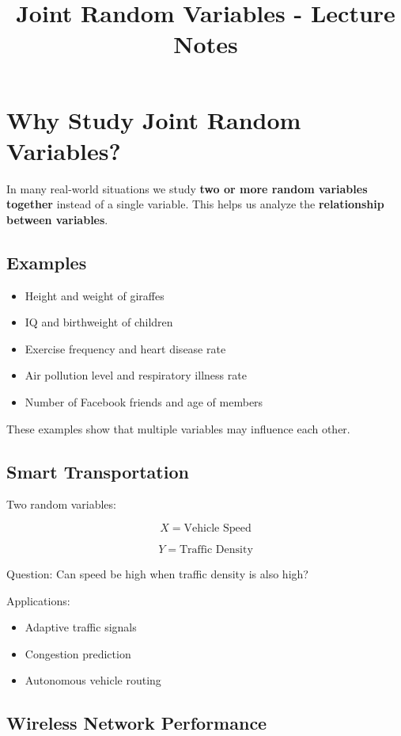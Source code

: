 \documentclass{article}
\title{Joint Random Variables - Lecture Notes}
\author{}
\date{}
\begin{document}
\maketitle

\section{Why Study Joint Random Variables?}

In many real-world situations we study \textbf{two or more random variables together} instead of a single variable. This helps us analyze the \textbf{relationship between variables}.

\subsection{Examples}

\begin{itemize}
\item Height and weight of giraffes
\item IQ and birthweight of children
\item Exercise frequency and heart disease rate
\item Air pollution level and respiratory illness rate
\item Number of Facebook friends and age of members
\end{itemize}

These examples show that multiple variables may influence each other.

\subsection{Smart Transportation}

Two random variables:

\[
X = \text{Vehicle Speed}
\]

\[
Y = \text{Traffic Density}
\]

Question: Can speed be high when traffic density is also high?

Applications:

\begin{itemize}
\item Adaptive traffic signals
\item Congestion prediction
\item Autonomous vehicle routing
\end{itemize}

\subsection{Wireless Network Performance}
\end{document}
